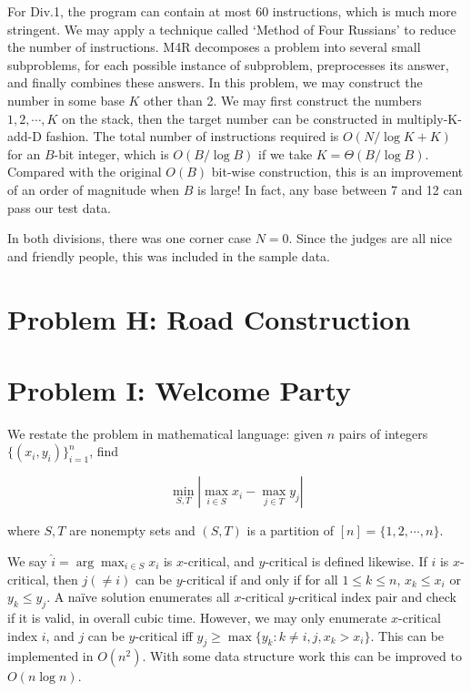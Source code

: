 \documentclass[a4paper,10.5pt,twoside]{article}
\begin{document}
For Div.1, the program can contain at most 60 instructions, which is much more stringent. We may apply a technique called `Method of Four Russians' to reduce the number of instructions. M4R decomposes a problem into several small subproblems,  for each possible instance of subproblem, preprocesses its answer, and finally combines these answers. In this problem, we may construct the number in some base $K$ other than 2. We may first construct the numbers $1, 2, \cdots, K$ on the stack, then the target number can be constructed in multiply-K-add-D fashion. The total number of instructions required is $O(N / \log K + K)$ for an $B$-bit integer, which is $O(B / \log B)$ if we take $K = \Theta(B / \log B)$. Compared with the original $O(B)$ bit-wise construction, this is an improvement of an order of magnitude when $B$ is large! In fact, any base between 7 and 12 can pass our test data.

In both divisions, there was one corner case $N = 0$. Since the judges are all nice and friendly people, this was included in the sample data.

\section*{Problem H: Road Construction}

\section*{Problem I: Welcome Party}

We restate the problem in mathematical language: given $n$ pairs of integers $\{(x_i, y_i)\}_{i=1}^n$, find

$$ \min_{S, T} | \max_{i \in S} x_i - \max_{j \in T} y_j | $$

where $S, T$ are nonempty sets and $(S, T)$ is a partition of $[n] = \{1, 2, \cdots, n\}$.

We say $\hat{i} = \arg\max_{i \in S} x_i$ is $x$-critical, and $y$-critical is defined likewise. If $i$ is $x$-critical, then $j (\neq i)$ can be $y$-critical if and only if for all $1 \leq k \leq n$, $x_k \leq x_i$ or $y_k \leq y_j$. A na\"ive solution enumerates all $x$-critical $y$-critical index pair and check if it is valid, in overall cubic time. However, we may only enumerate $x$-critical index $i$, and $j$ can be $y$-critical iff $y_j \geq \max\{y_k : k \neq i, j, x_k > x_i\}$. This can be implemented in $O(n^2)$. With some data structure work this can be improved to $O(n \log n)$.
\end{document}
